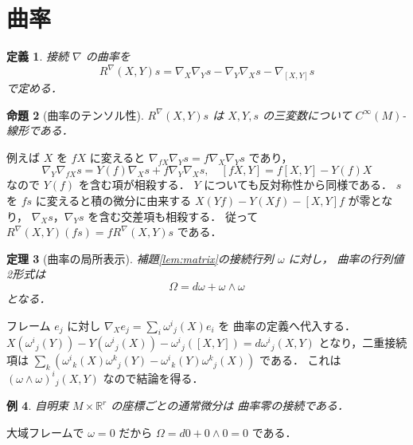 \documentclass[a5paper,10pt,onecolumn]{jsarticle}
\makeatletter
\theoremstyle{mathnotetheorem}
\newtheorem{theorem}{定理}[section]
\newtheorem{definition}[theorem]{定義}
\newtheorem{proposition}[theorem]{命題}
\newtheorem{example}[theorem]{例}
\renewcommand{\proofname}{証明}
\renewenvironment{proof}[1][\proofname]{%
  \par\pushQED{\qed}\normalfont\topsep4\p@\@plus2\p@\relax
  \trivlist\item[\hskip\labelsep\bfseries #1]\ignorespaces
}{\popQED\endtrivlist\@endpefalse}
\makeatother
\begin{document}
\section{曲率}
\begin{definition}
接続 $\nabla$ の曲率を
\[
 R^\nabla(X,Y)s=
 \nabla_X\nabla_Ys-\nabla_Y\nabla_Xs-\nabla_{[X,Y]}s
\]
で定める．
\end{definition}
\begin{proposition}[曲率のテンソル性]\label{prop:tensor}
$R^\nabla(X,Y)s$ は $X,Y,s$ の三変数について
$C^\infty(M)$-線形である．
\end{proposition}
\begin{proof}
例えば $X$ を $fX$ に変えると
$\nabla_{fX}\nabla_Ys=f\nabla_X\nabla_Ys$ であり，
\[
 \nabla_Y\nabla_{fX}s=
 Y(f)\nabla_Xs+f\nabla_Y\nabla_Xs,\quad
 [fX,Y]=f[X,Y]-Y(f)X
\]
なので $Y(f)$ を含む項が相殺する．
$Y$ についても反対称性から同様である．
$s$ を $fs$ に変えると積の微分に由来する
$X(Yf)-Y(Xf)-[X,Y]f$ が零となり，
$\nabla_Xs$，$\nabla_Ys$ を含む交差項も相殺する．
従って $R^\nabla(X,Y)(fs)=fR^\nabla(X,Y)s$ である．
\end{proof}
\begin{theorem}[曲率の局所表示]\label{thm:curvform}
補題\ref{lem:matrix}の接続行列 $\omega$ に対し，
曲率の行列値2形式は
\[
 \Omega=d\omega+\omega\wedge\omega
\]
となる．
\end{theorem}
\begin{proof}
フレーム $e_j$ に対し
$\nabla_Xe_j=\sum_i\omega^i{}_j(X)e_i$ を
曲率の定義へ代入する．
$X(\omega^i{}_j(Y))-Y(\omega^i{}_j(X))
-\omega^i{}_j([X,Y])=d\omega^i{}_j(X,Y)$
となり，二重接続項は
$\sum_k(\omega^i{}_k(X)\omega^k{}_j(Y)
-\omega^i{}_k(Y)\omega^k{}_j(X))$ である．
これは $(\omega\wedge\omega)^i{}_j(X,Y)$ なので結論を得る．
\end{proof}
\begin{example}
自明束 $M\times\mathbb R^r$ の座標ごとの通常微分は
曲率零の接続である．
\end{example}
\begin{proof}
大域フレームで $\omega=0$ だから
$\Omega=d0+0\wedge0=0$ である．
\end{proof}
\end{document}
